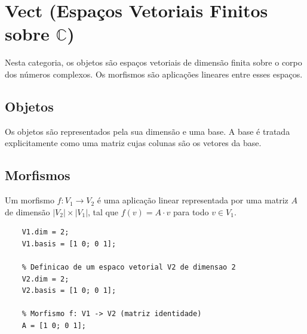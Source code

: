 \section{Vect (Espaços Vetoriais Finitos sobre $\mathbb{C}$)}
\label{sec:vect}

Nesta categoria, os objetos são espaços vetoriais de dimensão finita sobre o corpo dos números complexos. Os morfismos são aplicações lineares entre esses espaços.

\subsection{Objetos}
Os objetos são representados pela sua dimensão e uma base. A base é tratada explicitamente como uma matriz cujas colunas são os vetores da base.

\subsection{Morfismos}
Um morfismo $f: V_1 \to V_2$ é uma aplicação linear representada por uma matriz $A$ de dimensão $|V_2| \times |V_1|$, tal que $f(v) = A \cdot v$ para todo $v \in V_1$.

\begin{lstlisting}[style=matlab, caption={Exemplo de Espaco Vetorial e Morfismo}]
	% Definicao de um espaco vetorial V1 de dimensao 2
	V1.dim = 2;
	V1.basis = [1 0; 0 1];
	
	% Definicao de um espaco vetorial V2 de dimensao 2
	V2.dim = 2;
	V2.basis = [1 0; 0 1];
	
	% Morfismo f: V1 -> V2 (matriz identidade)
	A = [1 0; 0 1];
\end{lstlisting}